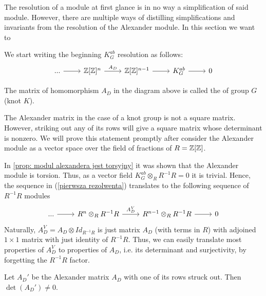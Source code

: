 The resolution of a module at first glance is in no way a simplification of said module. However, there are multiple ways of distilling simplifications and invariants from the resolution of the Alexander module. {\large\color{red}In this section we want to }

We start writing the beginning $K_G^{ab}$ resolution as follows:
\begin{equation}\label{pierwsza rezolwenta}
  \begin{tikzcd}
    ...\arrow[r] & \Z[\Z]^{n}\arrow[r, "A_D"] & \Z[\Z]^{n-1}\arrow[r] & K_G^{ab}\arrow[r] & 0
  \end{tikzcd}
\end{equation}


\begin{definition}
  The matrix of homomorphism $A_D$ in the diagram above is called the  of group $G$ (knot $K$).
\end{definition}

The Alexander matrix in the case of a knot group is not a square matrix. However, striking out any of its rows will give a square matrix whose determinant is nonzero. We will prove this statement promptly after consider the Alexander module as a vector space over the field of fractions of $R=\operatorname{\mathbb{Z}}[\operatorname{\mathbb{Z}}]$.

In \cref{prop: modul alexandera jest torsyjny} it was shown that the Alexander module is torsion. Thus, as a vector field $K_G^{ab}\otimes_R R^{-1}R=0$ it is trivial. Hence, the sequence in (\ref{pierwsza rezolwenta}) translates to the following sequence of $R^{-1}R$ modules
\begin{equation}\label{resolution vector spaces}
  \begin{tikzcd}
    ...\arrow[r] & R^n\otimes_R R^{-1}R \arrow[r, "A_D^V"] & R^{n-1}\otimes_R R^{-1}R \arrow[r] & 0
  \end{tikzcd}
\end{equation}
Naturally, $A_D^V=A_D\otimes Id_{R^{-1}R}$ is just matrix $A_D$ (with terms in $R$) with adjoined $1\times 1$ matrix with just identity of $R^{-1}R$. Thus, we can easily translate most properties of $A_D^V$ to properties of $A_D$, i.e. its determinant and surjectivity, by forgetting the $R^{-1}R$ factor.

\begin{proposition}\label{alexander matrix has trivial kernel}
  Let $A_D'$ be the Alexander matrix $A_D$ with one of its rows struck out. Then $\det(A_D')\neq 0$.
\end{proposition}

